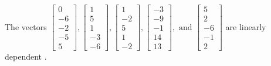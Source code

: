 \begin{exercise}
\begin{exerciseStatement}
  \end{exerciseStatement}
  \begin{exerciseAnswer}
   The vectors \(\left[\begin{array}{r}
0 \\
-6 \\
-2 \\
-5 \\
5
\end{array}\right] , \left[\begin{array}{r}
1 \\
5 \\
1 \\
-3 \\
-6
\end{array}\right] , \left[\begin{array}{r}
1 \\
-2 \\
5 \\
1 \\
-2
\end{array}\right] , \left[\begin{array}{r}
-3 \\
-9 \\
-1 \\
14 \\
13
\end{array}\right] , \text{ and } \left[\begin{array}{r}
5 \\
2 \\
-6 \\
-1 \\
2
\end{array}\right]\) are 
  	 linearly dependent  .
  


  \end{exerciseAnswer}
\end{exercise}